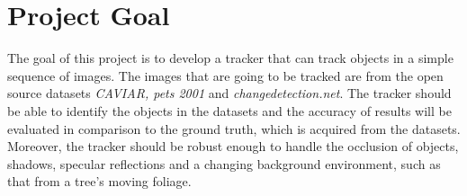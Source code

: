 \section{Project Goal}
The goal of this project is to develop a tracker that can track objects in a simple sequence of images. The images that are going to be tracked are from the open source datasets\textit{ CAVIAR, pets 2001 } and \textit{changedetection.net}. The tracker should be able to identify the objects in the datasets and the accuracy of results will be evaluated in comparison to the ground truth, which is acquired from the datasets. Moreover, the tracker should be robust enough to handle the occlusion of objects, shadows, specular reflections and a changing background environment, such as that from a tree's moving foliage.